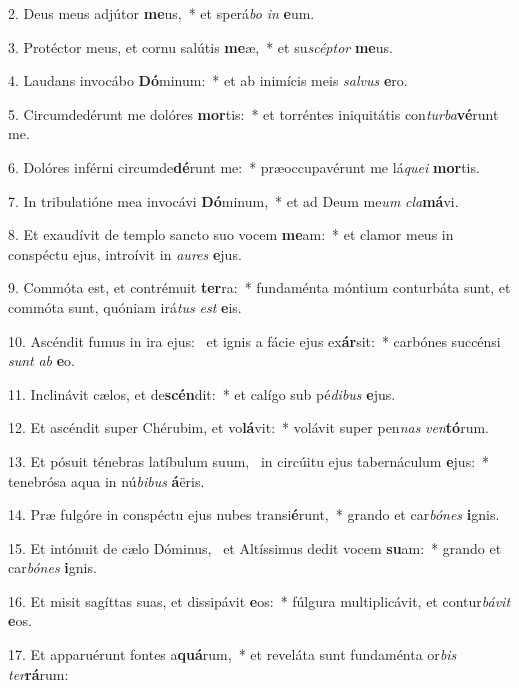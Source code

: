 2. Deus meus adjútor \textbf{me}us,~*  et sperá\textit{bo} \textit{in} \textbf{e}um.\

3. Protéctor meus, et cornu salútis \textbf{me}æ,~*  et su\textit{scép}\textit{tor} \textbf{me}us.\

4. Laudans invocábo \textbf{Dó}minum:~*  et ab inimícis meis \textit{sal}\textit{vus} \textbf{e}ro.\

5. Circumdedérunt me dolóres \textbf{mor}tis:~*  et torréntes iniquitátis con\textit{tur}\textit{ba}\textbf{vé}runt me.\

6. Dolóres inférni circumde\textbf{dé}runt me:~*  præoccupavérunt me lá\textit{que}\textit{i} \textbf{mor}tis.\

7. In tribulatióne mea invocávi \textbf{Dó}minum,~*  et ad Deum me\textit{um} \textit{cla}\textbf{má}vi.\

8. Et exaudívit de templo sancto suo vocem \textbf{me}am:~*  et clamor meus in conspéctu ejus, introívit in \textit{au}\textit{res} \textbf{e}jus.\

9. Commóta est, et contrémuit \textbf{ter}ra:~*  fundaménta móntium conturbáta sunt, et commóta sunt, quóniam irá\textit{tus} \textit{est} \textbf{e}is.\

10. Ascéndit fumus in ira ejus: \dag\  et ignis a fácie ejus ex\textbf{ár}sit:~*  carbónes succénsi \textit{sunt} \textit{ab} \textbf{e}o.\

11. Inclinávit cælos, et de\textbf{scén}dit:~*  et calígo sub pé\textit{di}\textit{bus} \textbf{e}jus.\

12. Et ascéndit super Chérubim, et vo\textbf{lá}vit:~*  volávit super pen\textit{nas} \textit{ven}\textbf{tó}rum.\

13. Et pósuit ténebras latíbulum suum, \dag\  in circúitu ejus tabernáculum \textbf{e}jus:~*  tenebrósa aqua in nú\textit{bi}\textit{bus} \textbf{á}ëris.\

14. Præ fulgóre in conspéctu ejus nubes transi\textbf{é}runt,~*  grando et car\textit{bó}\textit{nes} \textbf{i}gnis.\

15. Et intónuit de cælo Dóminus, \dag\  et Altíssimus dedit vocem \textbf{su}am:~*  grando et car\textit{bó}\textit{nes} \textbf{i}gnis.\

16. Et misit sagíttas suas, et dissipávit \textbf{e}os:~*  fúlgura multiplicávit, et contur\textit{bá}\textit{vit} \textbf{e}os.\

17. Et apparuérunt fontes a\textbf{quá}rum,~*  et reveláta sunt fundaménta or\textit{bis} \textit{ter}\textbf{rá}rum:\

